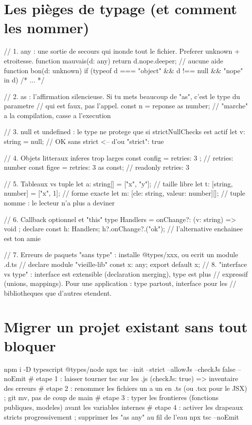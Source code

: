 \documentclass[12pt,a4paper,twoside,openright]{book}
\begin{document}
\section{Les pi\`eges de typage (et comment les nommer)}

\begin{codejs}
// 1. any : une sortie de secours qui inonde tout le fichier. Preferer unknown + etroitesse.
function mauvais(d: any) { return d.nope.deeper; }        // aucune aide
function bon(d: unknown) {
  if (typeof d === "object" && d !== null && "nope" in d) { /* ... */ }
}

// 2. as : l'affirmation silencieuse. Si tu mets beaucoup de "as", c'est le type du parametre
//    qui est faux, pas l'appel.
const n = reponse as number;          // "marche" a la compilation, casse a l'execution

// 3. null et undefined : le type ne protege que si strictNullChecks est actif
let v: string = null;                  // OK sans strict  <-- d'ou "strict": true

// 4. Objets litteraux inferes trop larges
const config = { retries: 3 };         // { retries: number }
const figee = { retries: 3 } as const; // { readonly retries: 3 }

// 5. Tableaux vs tuple
let a: string[] = ["x", "y"];          // taille libre
let t: [string, number] = ["x", 1];     // forme exacte
let m: [cle: string, valeur: number][];  // tuple nomme : le lecteur n'a plus a deviner

// 6. Callback optionnel et "this"
type Handlers = { onChange?: (v: string) => void };
declare const h: Handlers;
h?.onChange?.("ok");                     // l'alternative enchainee est ton amie

// 7. Erreurs de paquets "sans type" : installe @types/xxx, ou ecrit un module .d.ts
//    declare module "vieille-lib" { const x: any; export default x; }
// 8. "interface vs type" : interface est extensible (declaration merging), type est plus
//    expressif (unions, mappings). Pour une application : type partout, interface pour les
//    bibliotheques que d'autres etendent.
\end{codejs}

\section{Migrer un projet existant sans tout bloquer}

\begin{terminal}
npm i -D typescript @types/node
npx tsc --init --strict --allowJs --checkJs false --noEmit
# etape 1 : laisser tourner tsc sur les .js (checkJs: true) => inventaire des erreurs
# etape 2 : renommer les fichiers un a un en .ts (ou .tsx pour le JSX) ; git mv, pas de coup de main
# etape 3 : typer les frontieres (fonctions publiques, modeles) avant les variables internes
# etape 4 : activer les drapeaux stricts progressivement ; supprimer les "as any" au fil de l'eau
npx tsc --noEmit
\end{terminal}
\end{document}
